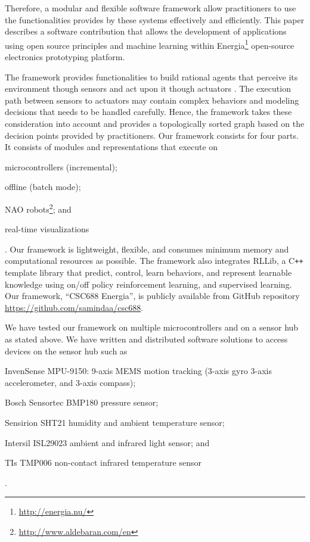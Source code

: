 \documentclass[letterpaper]{article}
\begin{document}
Therefore, a modular and flexible software
framework allow practitioners to use the functionalities provides by these systems effectively
and efficiently. This paper describes a software contribution that allows the development of
applications using open source principles and machine learning within
Energia\footnote{\url{http://energia.nu/}} open-source electronics prototyping platform.

The framework provides functionalities to build  rational agents that perceive its
environment though sensors and act upon it though actuators \cite{russel2009}. The execution path
between sensors to actuators may contain complex behaviors and modeling decisions that needs to be
handled carefully. Hence, the framework takes these consideration into account and provides a
topologically sorted graph based on the decision points provided by practitioners. Our
framework consists for four parts. It consists of modules and representations that execute on
\begin{inparaenum}[(1)]\item microcontrollers (incremental); \item offline (batch mode); \item NAO
robots\footnote{\url{http://www.aldebaran.com/en}}; and \item real-time
visualizations\end{inparaenum}. Our framework is lightweight, flexible, and consumes minimum memory
and computational resources as
possible. The framework also integrates RLLib, a C\texttt{++} template library that predict,
control, learn behaviors, and represent learnable knowledge using on/off policy reinforcement
learning, and supervised learning. Our framework, ``CSC688 Energia'', is publicly available from
GitHub repository \url{https://github.com/samindaa/csc688}.

We have tested our framework on multiple microcontrollers and on a sensor hub as stated above. We
have written and distributed software solutions to access devices on the sensor hub such as
\begin{inparaenum}[(1)] \item InvenSense MPU-9150: 9-axis MEMS motion tracking (3-axis gyro
3-axis accelerometer, and 3-axis compass); \item Bosch Sensortec BMP180 pressure sensor; \item
Sensirion SHT21 humidity and ambient temperature sensor; \item Intersil ISL29023 ambient and
infrared light sensor; and \item TIs TMP006 non-contact infrared temperature sensor\end{inparaenum}.
\end{document}
